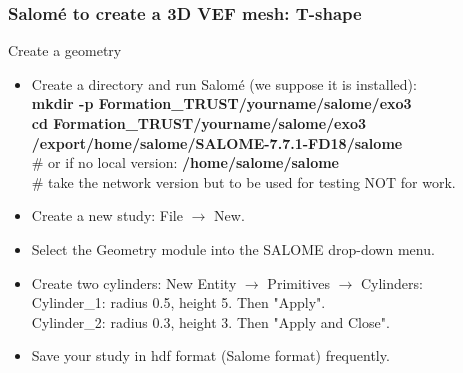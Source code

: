 \documentclass[10pt, hyperref={unicode=true,pdfusetitle, bookmarks=true,bookmarksnumbered=false,bookmarksopen=false, breaklinks=false,pdfborder={0 0 1},backref=true,colorlinks=true,linkcolor=darkblue,pageanchor}]{beamer}
\begin{document}
\begin{frame}
\frametitle{Salom\'e to create a 3D VEF mesh: T-shape}
\begin{block}{Create a geometry}

\begin{itemize}
\item Create a directory and run Salom\'e (we suppose it is installed):\\
\textbf{mkdir -p Formation\_TRUST/yourname/salome/exo3} \\
\textbf{cd Formation\_TRUST/yourname/salome/exo3} \\

\textbf{/export/home/salome/SALOME-7.7.1-FD18/salome} \\
\# or if no local version: {\scriptsize{\textbf{/home/salome/salome}}} \\
\# take the network version but to be used for testing NOT for work.

\item Create a new study: File $\rightarrow$ New.

\item Select the Geometry module into the SALOME drop-down menu.

\item Create two cylinders: New Entity $\rightarrow$ Primitives $\rightarrow$ Cylinders:\\
Cylinder\_1: radius 0.5, height 5. Then "Apply".\\
Cylinder\_2: radius 0.3, height 3. Then "Apply and Close".
\item Save your study in hdf format (Salome format) frequently.
\end{itemize}

\end{block}
\end{frame}
\end{document}
